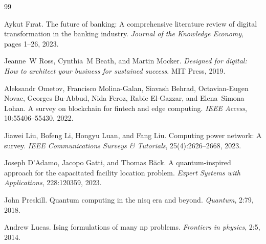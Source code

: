 \documentclass[11pt,a4paper]{article}
\begin{document}
\begin{thebibliography}{99}

Aykut F{\i}rat.
\newblock The future of banking: A comprehensive literature review of digital transformation in the banking industry.
\newblock \emph{Journal of the Knowledge Economy}, pages 1--26, 2023.

Jeanne~W Ross, Cynthia~M Beath, and Martin Mocker.
\newblock \emph{Designed for digital: How to architect your business for sustained success}.
\newblock MIT Press, 2019.

Aleksandr Ometov, Francisco Molina-Galan, Siavash Behrad, Octavian-Eugen Novac, Georges Bu-Abbud, Nida Feroz, Rabie El-Gazzar, and Elena~Simona Lohan.
\newblock A survey on blockchain for fintech and edge computing.
\newblock \emph{IEEE Access}, 10:55406--55430, 2022.

Jiawei Liu, Bofeng Li, Hongyu Luan, and Fang Liu.
\newblock Computing power network: A survey.
\newblock \emph{IEEE Communications Surveys \& Tutorials}, 25(4):2626--2668, 2023.

Joseph D'Adamo, Jacopo Gatti, and Thomas B{\"a}ck.
\newblock A quantum-inspired approach for the capacitated facility location problem.
\newblock \emph{Expert Systems with Applications}, 228:120359, 2023.

John Preskill.
\newblock Quantum computing in the nisq era and beyond.
\newblock \emph{Quantum}, 2:79, 2018.

Andrew Lucas.
\newblock Ising formulations of many np problems.
\newblock \emph{Frontiers in physics}, 2:5, 2014.

\end{thebibliography}
\end{document}
